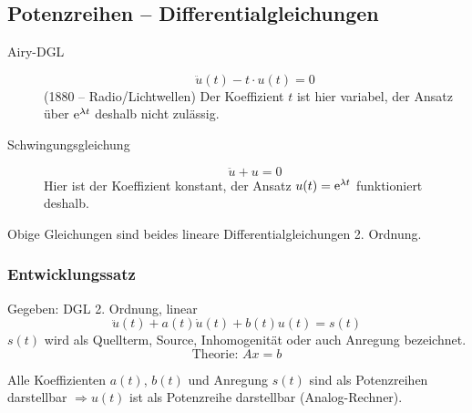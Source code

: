 
\subsection{Potenzreihen -- Differentialgleichungen}

\begin{description}
\item[Airy-DGL]
\begin{equation*}
	\ddot{u}(t) - t \cdot u(t) = 0
\end{equation*}
(1880 -- Radio/Lichtwellen) Der Koeffizient $t$ ist hier variabel, der Ansatz über $\operatorname{e}^{\lambda t}$ deshalb nicht zulässig.

\item[Schwingungsgleichung]
\begin{equation*}
	\ddot{u} + u = 0
\end{equation*}
Hier ist der Koeffizient konstant, der Ansatz $u(t) = \operatorname{e}^{\lambda t}$ funktioniert deshalb.

\end{description}
Obige Gleichungen sind beides lineare Differentialgleichungen 2. Ordnung.

\subsubsection*{Entwicklungssatz}
Gegeben: DGL 2. Ordnung, linear
\begin{equation*}
	\ddot{u}(t) + a(t)\dot{u}(t) + b(t)u(t) = s(t)
\end{equation*}
%
$s(t)$ wird als Quellterm, Source, Inhomogenität oder auch Anregung bezeichnet.
\begin{equation*}
	\text{Theorie: }Ax = b
\end{equation*}

\begin{theorem}[Entwicklungssatz]
	Alle Koeffizienten $a(t)$, $b(t)$ und Anregung $s(t)$ sind als Potenzreihen darstellbar $\Rightarrow u(t)$ ist als Potenzreihe darstellbar (Analog-Rechner).
\end{theorem}

